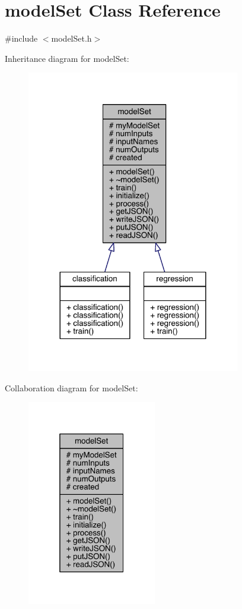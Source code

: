 \hypertarget{classmodel_set}{}\section{model\+Set Class Reference}
\label{classmodel_set}


{\ttfamily \#include $<$model\+Set.\+h$>$}



Inheritance diagram for model\+Set\+:\nopagebreak
\begin{figure}[H]
\begin{center}
\leavevmode
\includegraphics[width=264pt]{classmodel_set__inherit__graph}
\end{center}
\end{figure}


Collaboration diagram for model\+Set\+:\nopagebreak
\begin{figure}[H]
\begin{center}
\leavevmode
\includegraphics[width=160pt]{classmodel_set__coll__graph}
\end{center}
\end{figure}
